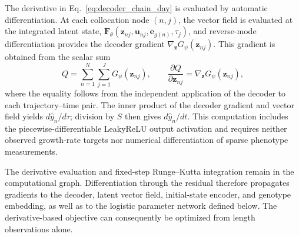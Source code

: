 \documentclass[preprint,12pt,authoryear]{elsarticle}
\begin{document}
The derivative in Eq.~\eqref{eq:decoder_chain_day} is evaluated by automatic differentiation. At each collocation node $(n,j)$, the vector field is evaluated at the integrated latent state, $\mathbf F_{\theta}(\mathbf z_{nj},\mathbf u_{nj},\mathbf e_{g(n)},\tau_j)$, and reverse-mode differentiation provides the decoder gradient $\nabla_{\mathbf z}G_{\psi}(\mathbf z_{nj})$. This gradient is obtained from the scalar sum
\begin{equation}
 Q=\sum_{n=1}^{N}\sum_{j=1}^{J}G_{\psi}(\mathbf z_{nj}),
 \qquad
 \frac{\partial Q}{\partial\mathbf z_{nj}}
 =\nabla_{\mathbf z}G_{\psi}(\mathbf z_{nj}),
 \label{eq:autodiff_decoder}
\end{equation}
where the equality follows from the independent application of the decoder to each trajectory--time pair. The inner product of the decoder gradient and vector field yields $d\hat y_n/d\tau$; division by $S$ then gives $d\hat y_n/dt$. This computation includes the piecewise-differentiable LeakyReLU output activation and requires neither observed growth-rate targets nor numerical differentiation of sparse phenotype measurements.

The derivative evaluation and fixed-step Runge--Kutta integration remain in the computational graph. Differentiation through the residual therefore propagates gradients to the decoder, latent vector field, initial-state encoder, and genotype embedding, as well as to the logistic parameter network defined below. The derivative-based objective can consequently be optimized from length observations alone.
\end{document}
